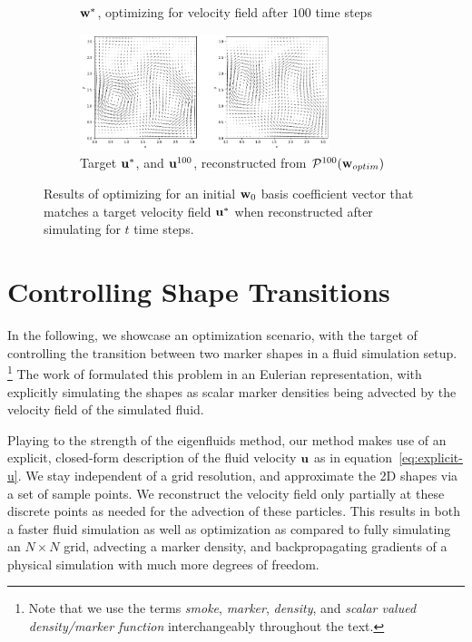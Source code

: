 \begin{figure}
\begin{subfigure}{\textwidth}
{    $\vb{w}^*$, optimizing for velocity field after $100$ time steps\\}
    \label{fig:100-timesteps-coeffs}
  \end{subfigure}\par\medskip
  \begin{subfigure}{\textwidth}
    \centering
    \includegraphics[width=0.8\textwidth]{figures/finding-initial-velocities/t_100_velocities.png}
    \caption{Target $\vb{u}^*$, and $\vb{u}^{100}$, reconstructed from
      $\mathcal{P}^{100}(\vb{w}_{optim})$}
    \label{fig:100-timesteps-vel}
  \end{subfigure}
  \caption{Results of optimizing for an initial $\vb{w}_0$ basis coefficient
    vector that matches a target velocity field $\vb{u}^*$ when reconstructed
    after simulating for $t$ time steps.
  }
  \label{fig:matching-velocities}
\end{figure}

\section{Controlling Shape Transitions}
\label{section:controlling-shape-transitions}
In the following, we showcase an optimization scenario, with the target of
controlling the transition between two marker shapes in a fluid simulation
setup. 
\footnote{Note that we use the terms \textit{smoke}, \textit{marker},
\textit{density}, and \textit{scalar valued density/marker function}
interchangeably throughout the text.}
The work of \citet{holl2019pdecontrol} formulated this problem in an
Eulerian representation, with explicitly simulating the shapes as scalar marker
densities being advected by the velocity field of the simulated fluid. 

Playing to the strength of the eigenfluids method, our method makes use of an
explicit, closed-form description of the fluid velocity $\vb{u}$ as in
equation~\eqref{eq:explicit-u}. We stay independent of a grid resolution, and
approximate the 2D shapes via a set of sample points. We reconstruct the
velocity field only partially at these discrete points as needed for the
advection of these particles. This results in both a faster fluid simulation as
well as optimization as compared to fully simulating an $N\times N$ grid,
advecting a marker density, and backpropagating gradients of a physical
simulation with much more degrees of freedom.

